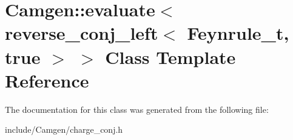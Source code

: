 \hypertarget{a00183}{\section{Camgen\-:\-:evaluate$<$ reverse\-\_\-conj\-\_\-left$<$ Feynrule\-\_\-t, true $>$ $>$ Class Template Reference}
\label{a00183}
}


The documentation for this class was generated from the following file\-:\begin{DoxyCompactItemize}
\item 
include/\-Camgen/charge\-\_\-conj.\-h\end{DoxyCompactItemize}
